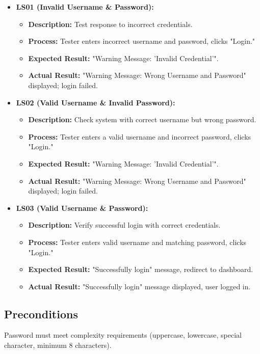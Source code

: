 \documentclass{article}
\begin{document}
\begin{itemize}
    \item \textbf{LS01 (Invalid Username \& Password):}
    \begin{itemize}
        \item \textbf{Description:} Test response to incorrect credentials.
        \item \textbf{Process:} Tester enters incorrect username and password, clicks "Login."
        \item \textbf{Expected Result:} "Warning Message: 'Invalid Credential'".
        \item \textbf{Actual Result:} "Warning Message: Wrong Username and Password" displayed; login failed.
    \end{itemize}
    \item \textbf{LS02 (Valid Username \& Invalid Password):}
    \begin{itemize}
        \item \textbf{Description:} Check system with correct username but wrong password.
        \item \textbf{Process:} Tester enters a valid username and incorrect password, clicks "Login."
        \item \textbf{Expected Result:} "Warning Message: 'Invalid Credential'".
        \item \textbf{Actual Result:} "Warning Message: Wrong Username and Password" displayed; login failed.
    \end{itemize}
    \item \textbf{LS03 (Valid Username \& Password):}
    \begin{itemize}
        \item \textbf{Description:} Verify successful login with correct credentials.
        \item \textbf{Process:} Tester enters valid username and matching password, clicks "Login."
        \item \textbf{Expected Result:} "Successfully login" message, redirect to dashboard.
        \item \textbf{Actual Result:} "Successfully login" message displayed, user logged in.
    \end{itemize}
\end{itemize}

\subsection{Preconditions}
Password must meet complexity requirements (uppercase, lowercase, special character, minimum 8 characters).
\end{document}
